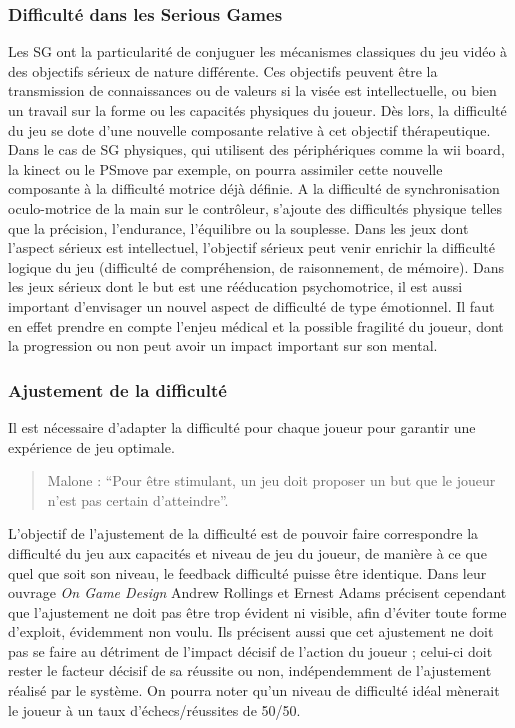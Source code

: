 	\subsubsection{Difficulté dans les Serious Games}
Les SG ont la particularité de conjuguer les mécanismes classiques du jeu vidéo à des objectifs sérieux de nature différente. Ces objectifs peuvent être la transmission de connaissances ou de valeurs si la visée est intellectuelle, ou bien un travail sur la forme ou les capacités physiques du joueur. Dès lors, la difficulté du jeu se dote d’une nouvelle composante relative à cet objectif thérapeutique.\\
Dans le cas de SG physiques, qui utilisent des périphériques comme la wii board, la kinect ou le PSmove par exemple, on pourra assimiler cette nouvelle composante à la difficulté motrice déjà définie. A la difficulté de synchronisation oculo-motrice de la main sur le contrôleur, s’ajoute des difficultés physique telles que la précision, l’endurance, l’équilibre ou la souplesse.
Dans les jeux dont l’aspect sérieux est intellectuel, l’objectif sérieux peut venir enrichir la difficulté logique du jeu (difficulté de compréhension, de raisonnement, de mémoire).
Dans les jeux sérieux dont le but est une rééducation psychomotrice, il est aussi important d’envisager un nouvel aspect de difficulté de type émotionnel. Il faut en effet prendre en compte l’enjeu médical et la possible fragilité du joueur, dont la progression ou non peut avoir un impact important sur son mental.
		
	\subsubsection{Ajustement de la difficulté}
Il est nécessaire d'adapter la difficulté pour chaque joueur pour garantir une expérience de jeu optimale.			
\begin{quote}Malone : “Pour être stimulant, un jeu doit proposer un but que le joueur n’est pas certain d’atteindre”.
\end{quote}

L’objectif de l’ajustement de la difficulté est de pouvoir faire correspondre la difficulté du jeu aux capacités et niveau de jeu du joueur, de manière à ce que quel que soit son niveau, le feedback difficulté puisse être identique. Dans leur ouvrage \emph{On Game Design} \cite{Andr03} Andrew Rollings et Ernest Adams précisent cependant que l’ajustement ne doit pas être trop évident ni visible, afin d’éviter toute forme d’exploit, évidemment non voulu. Ils précisent aussi que cet ajustement ne doit pas se faire au détriment de l’impact décisif de l’action du joueur ; celui-ci doit rester le facteur décisif de sa réussite ou non, indépendemment de l’ajustement réalisé par le système. On pourra noter qu’un niveau de difficulté idéal mènerait le joueur à un taux d’échecs/réussites de 50/50.

